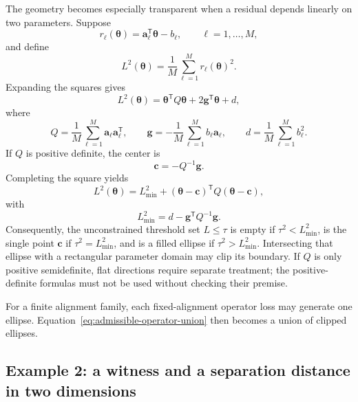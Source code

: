The geometry becomes especially transparent when a residual depends linearly
on two parameters. Suppose
\begin{equation}
  r_{\ell}(\boldsymbol\theta)
  =
  \mathbf a_{\ell}^{\mathsf T}\boldsymbol\theta-b_{\ell},
  \qquad \ell=1,\ldots,M,
\end{equation}
and define
\begin{equation}
  L^2(\boldsymbol\theta)
  =
  \frac{1}{M}
  \sum_{\ell=1}^{M}
  r_{\ell}(\boldsymbol\theta)^2.
\end{equation}
Expanding the squares gives
\begin{equation}
  L^2(\boldsymbol\theta)
  =
  \boldsymbol\theta^{\mathsf T}Q\boldsymbol\theta
  +2\mathbf g^{\mathsf T}\boldsymbol\theta+d,
  \label{eq:admissible-expanded-quadratic}
\end{equation}
where
\begin{equation}
  Q=\frac{1}{M}\sum_{\ell=1}^{M}
      \mathbf a_{\ell}\mathbf a_{\ell}^{\mathsf T},
  \qquad
  \mathbf g=-\frac{1}{M}\sum_{\ell=1}^{M}b_{\ell}\mathbf a_{\ell},
  \qquad
  d=\frac{1}{M}\sum_{\ell=1}^{M}b_{\ell}^{2}.
\end{equation}
If $Q$ is positive definite, the center is
\begin{equation}
  \mathbf c=-Q^{-1}\mathbf g.
\end{equation}
Completing the square yields
\begin{equation}
  L^2(\boldsymbol\theta)
  =
  L_{\min}^{2}
  +
  (\boldsymbol\theta-\mathbf c)^{\mathsf T}
  Q
  (\boldsymbol\theta-\mathbf c),
  \label{eq:admissible-centered-quadratic}
\end{equation}
with
\begin{equation}
  L_{\min}^{2}=d-\mathbf g^{\mathsf T}Q^{-1}\mathbf g.
\end{equation}
Consequently, the unconstrained threshold set $L\leq\tau$ is empty if
$\tau^2<L_{\min}^2$, is the single point $\mathbf c$ if
$\tau^2=L_{\min}^2$, and is a filled ellipse if
$\tau^2>L_{\min}^2$. Intersecting that ellipse with a rectangular parameter
domain may clip its boundary. If $Q$ is only positive semidefinite, flat
directions require separate treatment; the positive-definite formulas must not
be used without checking their premise.

For a finite alignment family, each fixed-alignment operator loss may generate
one ellipse. Equation~\eqref{eq:admissible-operator-union} then becomes a union
of clipped ellipses.

\subsection{Example 2: a witness and a separation distance in two dimensions}

